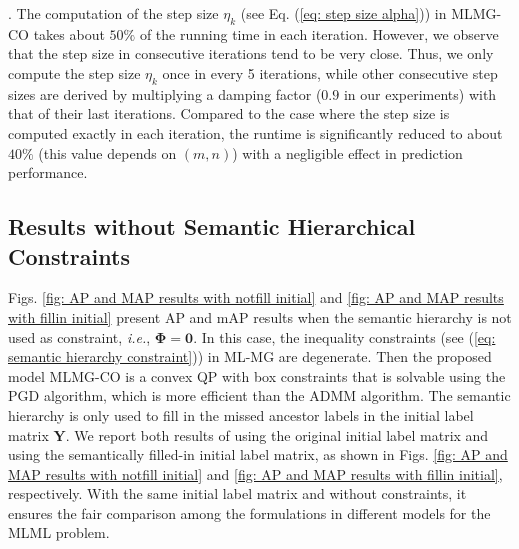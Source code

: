 \documentclass[twocolumn]{svjour3}          %
\newcommand{\Y}{\mathbf{Y}}
\begin{document}
\vspace{2pt}.
The computation of the step size $\eta_k$ (see Eq. (\ref{eq: step size alpha})) in MLMG-CO takes about $50\%$ of the running time in each iteration. However, we observe that the step size in consecutive iterations tend to be very close. Thus, we only compute the step size $\eta_k$ once in every 5 iterations, while other consecutive step sizes are derived by multiplying a damping factor ($0.9$ in our experiments) with that of their last iterations. Compared to the case where the step size is computed exactly in each iteration, the runtime is significantly reduced to about $40\%$ (this value depends on $(m,n)$) with a negligible effect in prediction performance.



\subsection{Results without Semantic Hierarchical Constraints}
\label{sec: 5 subsec results without semantic hierarchy}

Figs. \ref{fig: AP and MAP results with notfill initial} and \ref{fig: AP and MAP results with fillin initial} present AP and mAP results when the semantic hierarchy is not used as constraint, {\it i.e.}, $\mathbf{\Phi}=\mathbf{0}$. 
In this case, the inequality constraints (see (\ref{eq: semantic hierarchy constraint}))  in ML-MG are degenerate. Then the proposed model MLMG-CO is a convex QP with box constraints that is solvable using the PGD algorithm, which is more efficient than the ADMM algorithm. 
The semantic hierarchy is only used to fill in the missed ancestor labels in the initial label matrix $\Y$. 
We report both results of using the original initial label matrix and using the semantically filled-in initial label matrix, as shown in Figs. \ref{fig: AP and MAP results with notfill initial} and \ref{fig: AP and MAP results with fillin initial},  respectively. 
With the same initial label matrix and without constraints, it ensures the fair comparison among the formulations in different models for the MLML problem.
\end{document}
